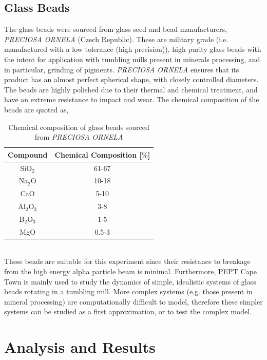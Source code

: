 \documentclass[]{article}
\begin{document}
\subsection{Glass Beads}
The glass beads were sourced from glass seed and bead manufacturers, \textit{PRECIOSA ORNELA} (Czech Republic). These are military grade (i.e. manufactured with a low tolerance (high precision)), high purity glass beads with the intent for application with tumbling mills present in minerals processing, and in particular, grinding of pigments. \textit{PRECIOSA ORNELA} ensures that its product has an almost perfect spherical shape, with closely controlled diameters. The beads are highly polished due to their thermal and chemical treatment, and have an extreme resistance to impact and wear\cite{glassbeads}. The chemical composition of the beads are quoted as,

\begin{table}[h!]
	\begin{tabular}{c|c}\toprule
		Compound & Chemical Composition [$\%$]\\ \hline\hline 
		SiO$_2$ & 61-67\\
		Na$_2$O & 10-18\\
		CaO  &  5-10\\
		Al$_2$O$_3$  &  3-8\\
		B$_2$O$_3$  &  1-5\\
		MgO   & 0.5-3\\
		\bottomrule
		
	\end{tabular}
\centering

\captionsetup{justification=centering,margin=2cm}
\caption{Chemical composition of glass beads sourced from \textit{PRECIOSA ORNELA}\cite{glassbeads}}
\label{table:beadsChemcialComposition}
\end{table}
~\\
These beads are suitable for this experiment since their resistance to breakage from the high energy alpha particle beam is minimal. Furthermore, PEPT Cape Town is mainly used to study the dynamics of simple, idealistic systems of glass beads rotating in a tumbling mill. More complex systems (e.g. those present in mineral processing) are computationally difficult to model, therefore these simpler systems can be studied as a first approximation, or to test the complex model.


\section{Analysis and Results}
\end{document}
